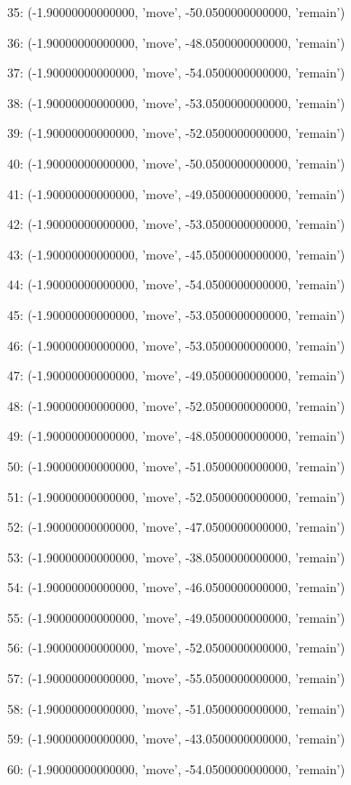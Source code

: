35: (-1.90000000000000, 'move', -50.0500000000000, 'remain')


36: (-1.90000000000000, 'move', -48.0500000000000, 'remain')


37: (-1.90000000000000, 'move', -54.0500000000000, 'remain')


38: (-1.90000000000000, 'move', -53.0500000000000, 'remain')


39: (-1.90000000000000, 'move', -52.0500000000000, 'remain')


40: (-1.90000000000000, 'move', -50.0500000000000, 'remain')


41: (-1.90000000000000, 'move', -49.0500000000000, 'remain')


42: (-1.90000000000000, 'move', -53.0500000000000, 'remain')


43: (-1.90000000000000, 'move', -45.0500000000000, 'remain')


44: (-1.90000000000000, 'move', -54.0500000000000, 'remain')


45: (-1.90000000000000, 'move', -53.0500000000000, 'remain')


46: (-1.90000000000000, 'move', -53.0500000000000, 'remain')


47: (-1.90000000000000, 'move', -49.0500000000000, 'remain')


48: (-1.90000000000000, 'move', -52.0500000000000, 'remain')


49: (-1.90000000000000, 'move', -48.0500000000000, 'remain')


50: (-1.90000000000000, 'move', -51.0500000000000, 'remain')


51: (-1.90000000000000, 'move', -52.0500000000000, 'remain')


52: (-1.90000000000000, 'move', -47.0500000000000, 'remain')


53: (-1.90000000000000, 'move', -38.0500000000000, 'remain')


54: (-1.90000000000000, 'move', -46.0500000000000, 'remain')


55: (-1.90000000000000, 'move', -49.0500000000000, 'remain')


56: (-1.90000000000000, 'move', -52.0500000000000, 'remain')


57: (-1.90000000000000, 'move', -55.0500000000000, 'remain')


58: (-1.90000000000000, 'move', -51.0500000000000, 'remain')


59: (-1.90000000000000, 'move', -43.0500000000000, 'remain')


60: (-1.90000000000000, 'move', -54.0500000000000, 'remain')


